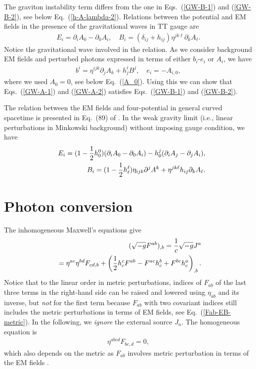 \documentclass[twocolumn,amsmath,amssymb]{revtex4}
\newcommand{\bea}{\begin{eqnarray}}
\newcommand{\eea}{\end{eqnarray}}
\begin{document}
The graviton instability term differs from the one in Eqs.\ (\ref{GW-B-1}) and (\ref{GW-B-2}), see below Eq.\ (\ref{h-A-lambda-2}). Relations between the potential and EM fields in the presence of the gravitational waves in TT gauge are \cite{Hwang-Noh-2023-EM-NL}
\bea
   E_i = \partial_i A_0 - \partial_0 A_i, \quad
       B_i = ( \delta_{ij} + h_{ij} ) \eta^{jk\ell}
       \partial_k A_\ell.
   \label{EM-A-TT}
\eea
Notice the gravitational wave involved in the relation. As we consider background EM fields and perturbed photons expressed in terms of either $b_i$-$e_i$ or $A_i$, we have
\bea
   b^i = \eta^{ijk} \partial_j A_k + h^i_j B^j, \quad
       e_i = - A_{i,0},
   \label{b-A}
\eea
where we used $A_0 = 0$, see below Eq.\ (\ref{A_0}). Using this we can show that Eqs.\ (\ref{GW-A-1}) and (\ref{GW-A-2}) satisfies Eqs.\ (\ref{GW-B-1}) and (\ref{GW-B-2}).

The relation between the EM fields and four-potential in general curved spacetime is presented in Eq.\ (89) of \cite{Hwang-Noh-2023-EM-NL}. In the weak gravity limit (i.e., linear perturbations in Minkowski background) without imposing gauge condition, we have
\bea
   & & E_i = ( 1 - {1 \over 2} h^0_0 )
       ( \partial_i A_0 - \partial_0 A_i )
       - h^j_0 ( \partial_i A_j - \partial_j A_i ),
   \nonumber \\
   & & B_i = ( 1 - {1 \over 2} h^\ell_\ell ) \eta_{ijk}
       \partial^j A^k
       + \eta^{jk\ell} h_{ij} \partial_k A_\ell.
   \label{EM-A-linear}
\eea


%
%
%
\section{Photon conversion}
                                        \label{sec:photon}

The inhomogeneous Maxwell's equations give
\bea
   & & \hskip -.9cm
       (\sqrt{-g} F^{ab})_{,b}
       = {1 \over c} \sqrt{-g} J^a
   \nonumber \\
   & & \hskip -.9cm
       \qquad
       = \eta^{ac} \eta^{bd} F_{cd,b}
       + \left( {1 \over 2} h^c_c F^{ab}
       - F^{ac} h^b_c + F^{bc} h^a_c \right)_{,b}.
   \label{Maxwell-Fab-1}
\eea
Notice that to the linear order in metric perturbations, indices of $F_{ab}$ of the last three terms in the right-hand side can be raised and lowered using $\eta_{ab}$ and its inverse, but {\it not} for the first term because $F_{ab}$ with two covariant indices still includes the metric perturbations in terms of EM fields, see Eq.\ (\ref{Fab-EB-metric}). In the following, we {\it ignore} the external source $J_a$. The homogeneous equation is
\bea
   \eta^{abcd} F_{bc,d} = 0,
   \label{Maxwell-Fab-2}
\eea
which also depends on the metric as $F_{ab}$ involves metric perturbation in terms of the EM fields \cite{EM-definition, Hwang-Noh-2023-EM-NL}.
\end{document}
